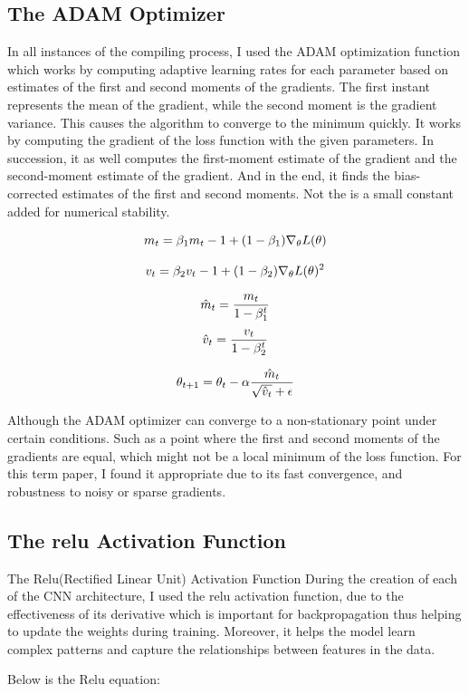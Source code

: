 \documentclass[twocolumn]{article}
\begin{document}
\subsection{The ADAM Optimizer}
In all instances of the compiling process, I used the ADAM optimization function which works by computing adaptive learning rates for each parameter based on estimates of the first and second moments of the gradients.\cite{reddi2019convergence} The first instant represents the mean of the gradient, while the second moment is the gradient variance. This causes the algorithm to converge to the minimum quickly.
It works by computing the gradient of the loss function with the given parameters. \cite{kingma2014method} In succession, it as well computes the first-moment estimate of the gradient and the second-moment estimate of the gradient. And in the end, it finds the bias-corrected estimates of the first and second moments. Not the  is a small constant added for numerical stability.


\[m_t = \beta_1m_t-1 + (1-\beta_1)\nabla_\theta L(\theta)\]

\[v_t = \beta_2v_t-1 + (1-\beta_2)\nabla_\theta L(\theta)^2\]

\[\hat{m}_t = \frac{m_t}{1-\beta_1^t}\]
\[\hat{v}_t = \frac{v_t}{1-\beta_2^t}\]

\[\theta_{t+1} = \theta_t - \alpha\frac{\hat{m}_t}{\sqrt{\hat{v}_t} + \epsilon}\]

Although the ADAM optimizer can converge to a non-stationary point under certain conditions.\cite{ruder2016overview} Such as a point where the first and second moments of the gradients are equal, which might not be a local minimum of the loss function. For this term paper, I found it appropriate due to its fast convergence, and robustness to noisy or sparse gradients.

\subsection{The relu Activation Function}
The Relu(Rectified Linear Unit) Activation Function
During the creation of each of the CNN architecture, I used the relu activation function, due to the effectiveness of its derivative which is important for backpropagation thus helping to update the weights during training. Moreover, it helps the model learn complex patterns and capture the relationships between features in the data.

Below is the Relu equation:\\
\end{document}

